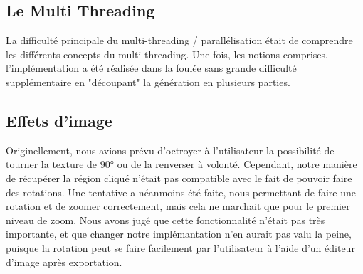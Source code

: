 \documentclass{article}
\begin{document}
	\subsection{Le Multi Threading}
	La difficulté principale du multi-threading / parallélisation était de comprendre les différents concepts du multi-threading.
	Une fois, les notions comprises, l'implémentation a été réalisée dans la foulée sans grande difficulté supplémentaire en "découpant" la génération en plusieurs parties.

	\subsection{Effets d'image}

	Originellement, nous avions prévu d'octroyer à l'utilisateur la possibilité de tourner la texture de 90° ou de la renverser à volonté.
	Cependant, notre manière de récupérer la région cliqué n'était pas compatible avec le fait de pouvoir faire des rotations.
	Une tentative a néanmoins été faite, nous permettant de faire une rotation et de zoomer correctement, mais cela ne marchait que pour le premier niveau de zoom.
	Nous avons jugé que cette fonctionnalité n'était pas très importante, et que changer notre implémantation n'en aurait pas valu la peine, puisque la rotation peut se faire facilement par l'utilisateur à l'aide d'un éditeur d'image après exportation.
\end{document}
